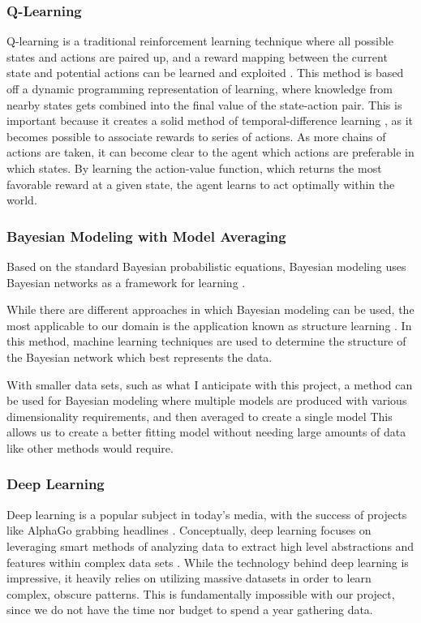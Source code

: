\subsubsection{Q-Learning}
Q-learning is a traditional reinforcement learning technique where all possible states and actions are paired up, and a reward mapping between the current state and potential actions can be learned and exploited \cite{SuttonBarto}.
This method is based off a dynamic programming representation of learning, where knowledge from nearby states gets combined into the final value of the state-action pair.
This is important because it creates a solid method of temporal-difference learning \cite{SuttonBarto}, as it becomes possible to associate rewards to series of actions.
As more chains of actions are taken, it can become clear to the agent which actions are preferable in which states.
By learning the action-value function, which returns the most favorable reward at a given state, the agent learns to act optimally within the world.
\subsubsection{Bayesian Modeling with Model Averaging}
Based on the standard Bayesian probabilistic equations, Bayesian modeling uses Bayesian networks as a framework for learning \cite{RussellNorvig}.

While there are different approaches in which Bayesian modeling can be used, the most applicable to our domain is the application known as structure learning \cite{RussellNorvig}.
In this method, machine learning techniques are used to determine the structure of the Bayesian network which best represents the data.

With smaller data sets, such as what I anticipate with this project, a method can be used for Bayesian modeling where multiple models are produced with various dimensionality requirements, and then averaged to create a single model \cite{RussellNorvig}
This allows us to create a better fitting model without needing large amounts of data like other methods would require.

\subsubsection{Deep Learning}
Deep learning is a popular subject in today's media, with the success of projects like AlphaGo grabbing headlines \cite{alphago}.
Conceptually, deep learning focuses on leveraging smart methods of analyzing data to extract high level abstractions and features within complex data sets \cite{Goodfellow-et-al-2016-Book}.
While the technology behind deep learning is impressive, it heavily relies on utilizing massive datasets in order to learn complex, obscure patterns.
This is fundamentally impossible with our project, since we do not have the time nor budget to spend a year gathering data.

